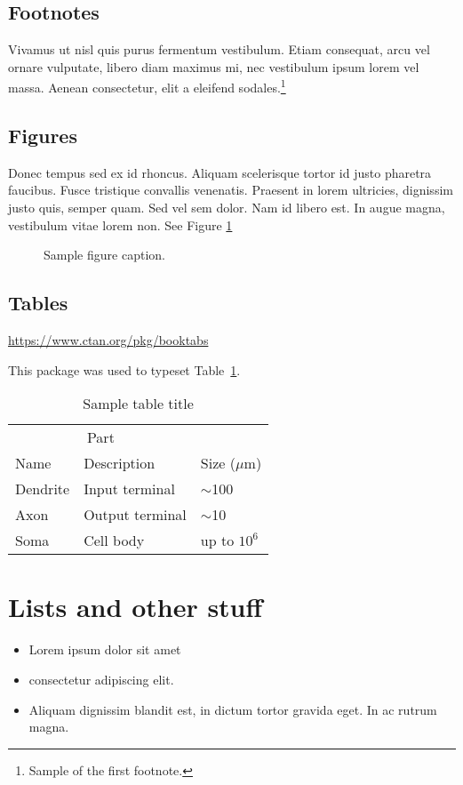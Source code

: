\documentclass{article}
\begin{document}
\subsection{Footnotes}

Vivamus ut nisl quis purus fermentum vestibulum. Etiam consequat, arcu vel ornare vulputate, libero diam maximus mi, nec vestibulum ipsum lorem vel massa. Aenean consectetur, elit a eleifend sodales.\footnote{Sample of the first footnote.}


\subsection{Figures}
Donec tempus sed ex id rhoncus. Aliquam scelerisque tortor id justo pharetra faucibus. Fusce tristique convallis venenatis. Praesent in lorem ultricies, dignissim justo quis, semper quam. Sed vel sem dolor. Nam id libero est. In augue magna, vestibulum vitae lorem non. See Figure \ref{fig:fig1}

\begin{figure}
  \centering
  \fbox{\rule[-.5cm]{0cm}{4cm} \rule[-.5cm]{4cm}{0cm}}
  \caption{Sample figure caption.}
  \label{fig:fig1}
\end{figure}

\subsection{Tables}

\begin{center}
  \url{https://www.ctan.org/pkg/booktabs}
\end{center}
This package was used to typeset Table~\ref{sample-table}.

\begin{table}
  \caption{Sample table title}
  \label{sample-table}
  \centering
  \begin{tabular}{lll}
    \toprule
    \multicolumn{2}{c}{Part}                   \\
    \cmidrule(r){1-2}
    Name     & Description     & Size ($\mu$m) \\
    \midrule
    Dendrite & Input terminal  & $\sim$100     \\
    Axon     & Output terminal & $\sim$10      \\
    Soma     & Cell body       & up to $10^6$  \\
    \bottomrule
  \end{tabular}
\end{table}

\section{Lists and other stuff}

\begin{itemize}

\item Lorem ipsum dolor sit amet
\item consectetur adipiscing elit. 
\item Aliquam dignissim blandit est, in dictum tortor gravida eget. In ac rutrum magna.
\end{itemize}





\end{document}
